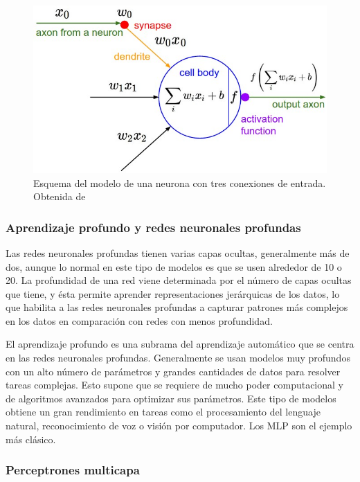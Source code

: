 \begin{figure}
    \centering
    \includegraphics[width=0.75\linewidth]{Plantilla_TFG_latex//imagenes//Inf//2.Fund/neuron_model.jpeg}
    \caption{Esquema del modelo de una neurona con tres conexiones de entrada. Obtenida de \cite{stanford_231}}
    \label{fig:Perceptron}
\end{figure}


\subsubsection{Aprendizaje profundo y redes neuronales profundas}

Las redes neuronales profundas tienen varias capas ocultas, generalmente más de dos, aunque lo normal en este tipo de modelos es que se usen alrededor de 10 o 20. La profundidad de una red viene determinada por el número de capas ocultas que tiene, y ésta permite aprender representaciones jerárquicas de los datos, lo que habilita a las redes neuronales profundas a capturar patrones más complejos en los datos en comparación con redes con menos profundidad.

El aprendizaje profundo es una subrama del aprendizaje automático que se centra en las redes neuronales profundas. Generalmente se usan modelos muy profundos con un alto número de parámetros y grandes cantidades de datos para resolver tareas complejas. Esto supone que se requiere de mucho poder computacional y de algoritmos avanzados para optimizar sus parámetros. Este tipo de modelos obtiene un gran rendimiento en tareas como el procesamiento del lenguaje natural, reconocimiento de voz o visión por computador. Los MLP son el ejemplo más clásico.





\subsubsection{Perceptrones multicapa}

